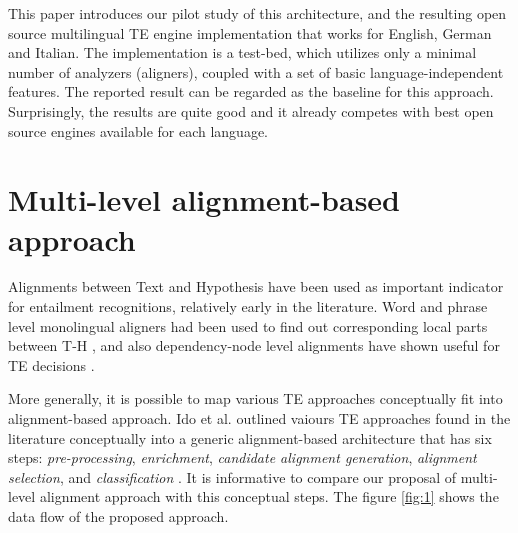 \documentclass[11pt,letterpaper]{article}
\begin{document}
This paper introduces our pilot study of this architecture, and the
resulting open source multilingual TE engine implementation that works
for English, German and Italian. The implementation is a test-bed,
which utilizes only a minimal number of analyzers (aligners), coupled
with a set of basic language-independent features. The reported result
can be regarded as the baseline for this approach. Surprisingly, the
results are quite good and it already competes with best open source
engines available for each language.     


\section{Multi-level alignment-based approach}
Alignments between Text and Hypothesis have been used as important
indicator for entailment recognitions, relatively early in the
literature. Word and phrase level monolingual aligners had been used
to find out corresponding local parts between T-H \cite{}, and also
dependency-node level alignments have shown useful for TE decisions
\cite{}.     

More generally, it is possible to map various TE approaches
conceptually fit into alignment-based approach. Ido et al. outlined
vaiours TE approaches found in the literature conceptually into a
generic alignment-based architecture that has six steps:
{\em pre-processing}, {\em enrichment}, {\em candidate alignment
  generation}, {\em alignment selection}, and {\em classification}
\cite{}.   
It is informative to compare our proposal of multi-level alignment
approach with this conceptual steps. The figure \ref{fig:1} shows the
data flow of the proposed approach. 
\end{document}

